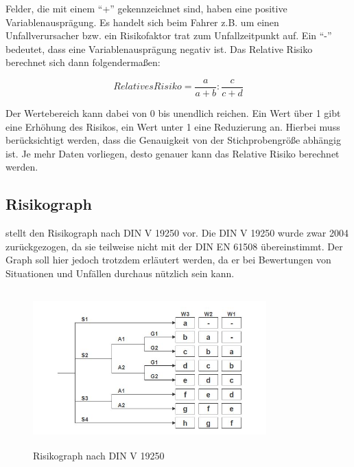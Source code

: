 Felder, die mit einem \enquote{+} gekennzeichnet sind, haben eine positive Variablenausprägung. Es handelt sich beim Fahrer z.B. um einen Unfallverursacher bzw. ein Risikofaktor trat zum Unfallzeitpunkt auf. Ein \enquote{-} bedeutet, dass eine Variablenausprägung negativ ist. Das Relative Risiko berechnet sich dann folgendermaßen:

\begin{equation}
	Relatives Risiko = \dfrac{a}{a+b}:\dfrac{c}{c+d}
\end{equation}

Der Wertebereich kann dabei von 0 bis unendlich reichen. Ein Wert über 1 gibt eine Erhöhung des Risikos, ein Wert unter 1 eine Reduzierung an. Hierbei muss berücksichtigt werden, dass die Genauigkeit von der Stichprobengröße abhängig ist. Je mehr Daten vorliegen, desto genauer kann das Relative Risiko berechnet werden.

\subsection{Risikograph}\label{subsection:Risikograph}
\Textcite[S. 50f]{Hillenbrand.2012} stellt den Risikograph nach DIN V 19250 vor. Die DIN V 19250 wurde zwar 2004 zurückgezogen, da sie teilweise nicht mit der DIN EN 61508 übereinstimmt. Der Graph soll hier jedoch trotzdem erläutert werden, da er bei Bewertungen von Situationen und Unfällen durchaus nützlich sein kann.

\begin{savenotes}
	\begin{figure}[H]
		\centering
		\includegraphics[width=9cm,height=6cm]{figures/Risikograph}
		\caption[Risikograph nach DIN V 1925]{Risikograph nach DIN V 19250 \parencite[S. 51]{Hillenbrand.2012}}\label{fig:Risikograph}
	\end{figure}
\end{savenotes}

